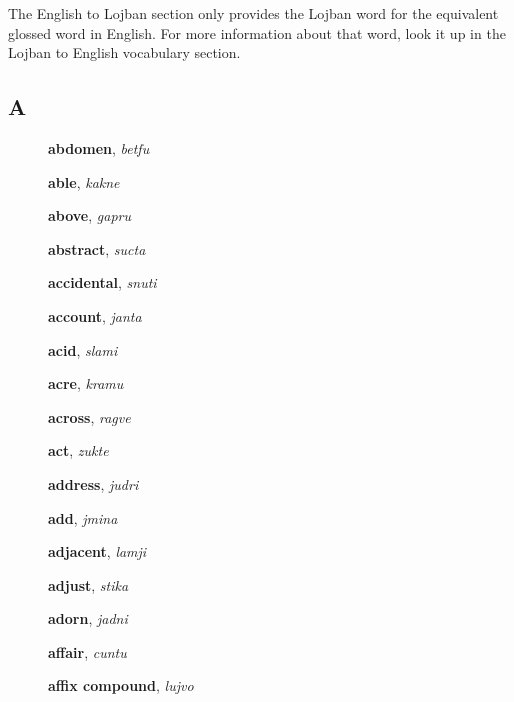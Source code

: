 \documentclass[12pt]{book}
\begin{document}
The English to Lojban section only provides the Lojban word for the equivalent glossed word in English. For more information about that word, look it up in the Lojban to English vocabulary section.

\subsection{A} %

\begin{description}
\item[ ] \textbf{abdomen}, \textit{betfu}

\item[ ] \textbf{able}, \textit{kakne}

\item[ ] \textbf{above}, \textit{gapru}

\item[ ] \textbf{abstract}, \textit{sucta}

\item[ ] \textbf{accidental}, \textit{snuti}

\item[ ] \textbf{account}, \textit{janta}

\item[ ] \textbf{acid}, \textit{slami}

\item[ ] \textbf{acre}, \textit{kramu}

\item[ ] \textbf{across}, \textit{ragve}

\item[ ] \textbf{act}, \textit{zukte}

\item[ ] \textbf{address}, \textit{judri}

\item[ ] \textbf{add}, \textit{jmina}

\item[ ] \textbf{adjacent}, \textit{lamji}

\item[ ] \textbf{adjust}, \textit{stika}

\item[ ] \textbf{adorn}, \textit{jadni}

\item[ ] \textbf{affair}, \textit{cuntu}

\item[ ] \textbf{affix compound}, \textit{lujvo}


\end{description}
\end{document}
